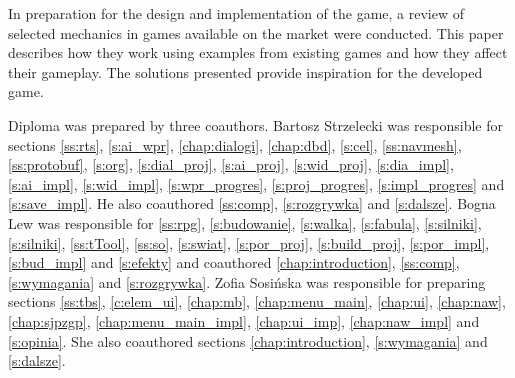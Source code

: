In preparation for the design and implementation of the game, a review of selected mechanics in games available
on the market were conducted. This paper describes how they work using examples from existing games and how
they affect their gameplay. The solutions presented provide inspiration for the developed game.

Diploma was prepared by three coauthors. Bartosz Strzelecki was responsible for sections \ref{ss:rts},
\ref{s:ai_wpr}, \ref{chap:dialogi}, \ref{chap:dbd}, \ref{s:cel}, \ref{ss:navmesh}, \ref{ss:protobuf}, \ref{s:org},
\ref{s:dial_proj}, \ref{s:ai_proj}, \ref{s:wid_proj}, \ref{s:dia_impl}, \ref{s:ai_impl}, \ref{s:wid_impl}, \ref{s:wpr_progres}, \ref{s:proj_progres}, \ref{s:impl_progres} and
\ref{s:save_impl}. He also coauthored \ref{ss:comp}, \ref{s:rozgrywka} and \ref{s:dalsze}. Bogna Lew
was responsible for \ref{ss:rpg}, \ref{s:budowanie}, \ref{s:walka}, \ref{s:fabula}, \ref{s:silniki}, \ref{s:silniki},
\ref{ss:tTool}, \ref{ss:so}, \ref{s:swiat}, \ref{s:por_proj}, \ref{s:build_proj}, \ref{s:por_impl}, \ref{s:bud_impl} and
\ref{s:efekty} and coauthored \ref{chap:introduction}, \ref{ss:comp}, \ref{s:wymagania} and \ref{s:rozgrywka}.
Zofia Sosińska was responsible for preparing sections \ref{ss:tbs}, \ref{c:elem_ui}, \ref{chap:mb},
\ref{chap:menu_main}, \ref{chap:ui}, \ref{chap:naw}, \ref{chap:sjpzgp}, \ref{chap:menu_main_impl}, \ref{chap:ui_imp},
\ref{chap:naw_impl} and  \ref{s:opinia}. She also coauthored sections \ref{chap:introduction}, \ref{s:wymagania} and \ref{s:dalsze}.
